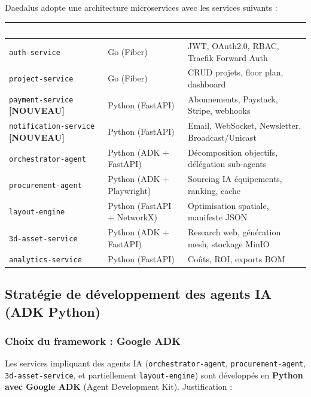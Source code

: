 \documentclass[12pt,a4paper]{article}
\newcommand{\NEW}{\textcolor{daedalusgold}{\textbf{[NOUVEAU]}}}
\begin{document}
Daedalus adopte une architecture microservices avec les services suivants :

\begin{tabularx}{\textwidth}{|l|l|X|}
\hline
\rowcolor{tablehead}\textcolor{white}{\textbf{Service}} & \textcolor{white}{\textbf{Tech}} & \textcolor{white}{\textbf{Responsabilité}} \\
\hline
\texttt{auth-service} & Go (Fiber) & JWT, OAuth2.0, RBAC, Traefik Forward Auth \\
\hline
\rowcolor{tablerow}
\texttt{project-service} & Go (Fiber) & CRUD projets, floor plan, dashboard \\
\hline
\texttt{payment-service} \NEW & Python (FastAPI) & Abonnements, Paystack, Stripe, webhooks \\
\hline
\rowcolor{tablerow}
\texttt{notification-service} \NEW & Python (FastAPI) & Email, WebSocket, Newsletter, Broadcast/Unicast \\
\hline
\texttt{orchestrator-agent} & Python (ADK + FastAPI) & Décomposition objectifs, délégation sub-agents \\
\hline
\rowcolor{tablerow}
\texttt{procurement-agent} & Python (ADK + Playwright) & Sourcing IA équipements, ranking, cache \\
\hline
\texttt{layout-engine} & Python (FastAPI + NetworkX) & Optimisation spatiale, manifeste JSON \\
\hline
\rowcolor{tablerow}
\texttt{3d-asset-service} & Python (ADK + FastAPI) & Research web, génération mesh, stockage MinIO \\
\hline
\texttt{analytics-service} & Python (FastAPI) & Coûts, ROI, exports BOM \\
\hline
\end{tabularx}

\subsection{Stratégie de développement des agents IA (ADK Python)}

\subsubsection{Choix du framework : Google ADK}

Les services impliquant des agents IA (\texttt{orchestrator-agent}, \texttt{procurement-agent}, \texttt{3d-asset-service}, et partiellement \texttt{layout-engine}) sont développés en \textbf{Python avec Google ADK} (Agent Development Kit). Justification :
\end{document}
